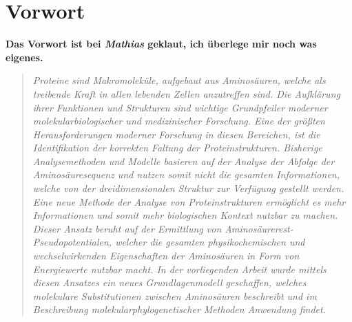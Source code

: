 \chapter{Vorwort} 	%

\textbf{Das Vorwort ist bei \emph{Mathias} geklaut, ich überlege mir noch was eigenes.}
\begin{quote}
\textit{Proteine sind Makromoleküle, aufgebaut aus Aminosäuren, welche als treibende Kraft in allen
lebenden Zellen anzutreffen sind. Die Aufklärung ihrer Funktionen und Strukturen sind wichtige
Grundpfeiler moderner molekularbiologischer und medizinischer Forschung. Eine der größten
Herausforderungen moderner Forschung in diesen Bereichen, ist die Identifikation der korrekten
Faltung der Proteinstrukturen. Bisherige Analysemethoden und Modelle basieren auf der Analyse
der Abfolge der Aminosäuresequenz und nutzen somit nicht die gesamten Informationen,
welche von der dreidimensionalen Struktur zur Verfügung gestellt werden.
Eine neue Methode der Analyse von Proteinstrukturen ermöglicht es mehr Informationen und somit
mehr biologischen Kontext nutzbar zu machen. Dieser Ansatz beruht auf der Ermittlung von
Aminosäurerest-Pseudopotentialen, welcher die gesamten physikochemischen und wechselwirkenden
Eigenschaften der Aminosäuren in Form von Energiewerte nutzbar macht. In der vorliegenden
Arbeit wurde mittels diesen Ansatzes ein neues Grundlagenmodell geschaffen, welches
molekulare Substitutionen zwischen Aminosäuren beschreibt und im Beschreibung molekularphylogenetischer
Methoden Anwendung findet.}
\end{quote}






